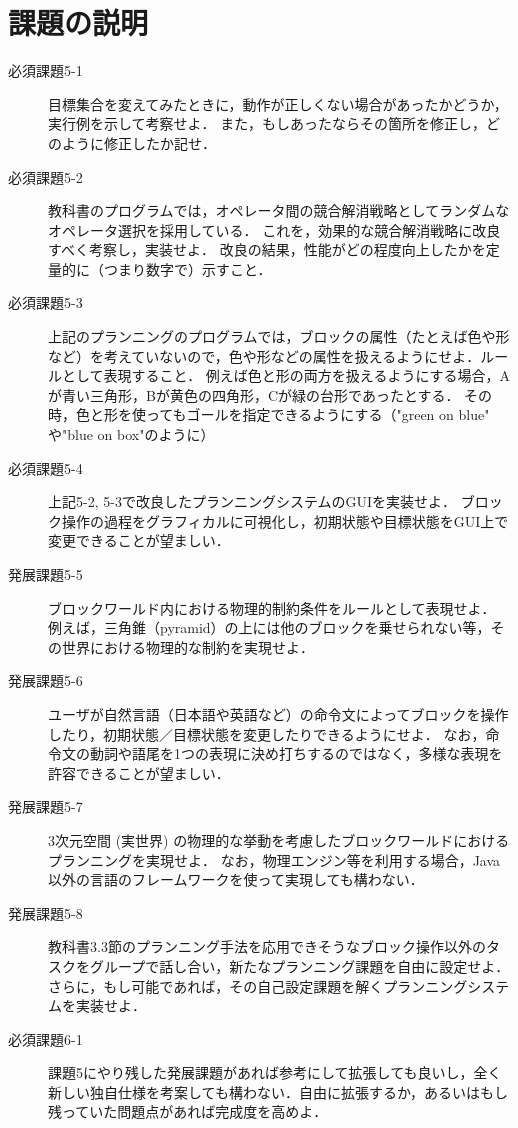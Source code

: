 \documentclass{jarticle}
\begin{document}
\section{課題の説明}
\begin{description}
    \item[必須課題5-1] 目標集合を変えてみたときに，動作が正しくない場合があったかどうか，実行例を示して考察せよ．
    また，もしあったならその箇所を修正し，どのように修正したか記せ．
    \item[必須課題5-2] 教科書のプログラムでは，オペレータ間の競合解消戦略としてランダムなオペレータ選択を採用している．
    これを，効果的な競合解消戦略に改良すべく考察し，実装せよ．
    改良の結果，性能がどの程度向上したかを定量的に（つまり数字で）示すこと．
    \item[必須課題5-3] 上記のプランニングのプログラムでは，ブロックの属性（たとえば色や形など）を考えていないので，色や形などの属性を扱えるようにせよ．ルールとして表現すること．
    例えば色と形の両方を扱えるようにする場合，Aが青い三角形，Bが黄色の四角形，Cが緑の台形であったとする．
    その時，色と形を使ってもゴールを指定できるようにする（"green on blue" や"blue on box"のように）
    \item[必須課題5-4] 上記5-2, 5-3で改良したプランニングシステムのGUIを実装せよ．
    ブロック操作の過程をグラフィカルに可視化し，初期状態や目標状態をGUI上で変更できることが望ましい．
    \item[発展課題5-5] ブロックワールド内における物理的制約条件をルールとして表現せよ．
    例えば，三角錐（pyramid）の上には他のブロックを乗せられない等，その世界における物理的な制約を実現せよ．
    \item[発展課題5-6] ユーザが自然言語（日本語や英語など）の命令文によってブロックを操作したり，初期状態／目標状態を変更したりできるようにせよ．
    なお，命令文の動詞や語尾を1つの表現に決め打ちするのではなく，多様な表現を許容できることが望ましい．
    \item[発展課題5-7] 3次元空間 (実世界) の物理的な挙動を考慮したブロックワールドにおけるプランニングを実現せよ．
    なお，物理エンジン等を利用する場合，Java以外の言語のフレームワークを使って実現しても構わない．
    \item[発展課題5-8] 教科書3.3節のプランニング手法を応用できそうなブロック操作以外のタスクをグループで話し合い，新たなプランニング課題を自由に設定せよ．
    さらに，もし可能であれば，その自己設定課題を解くプランニングシステムを実装せよ．
    \item[必須課題6-1] 課題5にやり残した発展課題があれば参考にして拡張しても良いし，全く新しい独自仕様を考案しても構わない．自由に拡張するか，あるいはもし残っていた問題点があれば完成度を高めよ．
\end{description}
\end{document}
